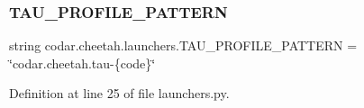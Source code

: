\subsubsection{\texorpdfstring{T\+A\+U\+\_\+\+P\+R\+O\+F\+I\+L\+E\+\_\+\+P\+A\+T\+T\+E\+RN}{TAU\_PROFILE\_PATTERN}}
{\footnotesize\ttfamily string codar.\+cheetah.\+launchers.\+T\+A\+U\+\_\+\+P\+R\+O\+F\+I\+L\+E\+\_\+\+P\+A\+T\+T\+E\+RN = \char`\"{}codar.\+cheetah.\+tau-\/\{code\}\char`\"{}}



Definition at line 25 of file launchers.\+py.

